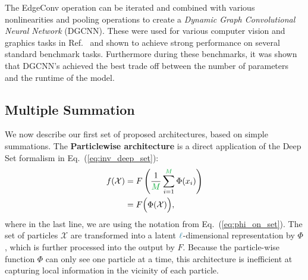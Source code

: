 \documentclass[aps,prd,twocolumn,superscriptaddress,floatfix,longbibliography,preprintnumbers,nofootinbib]{revtex4-1} %
\DeclareRobustCommand{\Eq}[1]{Eq.~(\ref{eq:#1})}
\newcounter{para}
\newcommand{\reft}[1]{Ref.~\cite{#1}}
\begin{document}
      The EdgeConv operation can be iterated and combined with various nonlinearities  and pooling operations to create a \textit{Dynamic Graph Convolutional Neural Network} (DGCNN). These were used for various computer vision and graphics tasks in \reft{Wang:2018nkf} and shown to achieve strong performance on several standard benchmark tasks.  Furthermore during these benchmarks, it was shown that DGCNN's achieved the best trade off between the number of parameters and the runtime of the model.

\subsection{Multiple Summation}
          \label{sec:local}
          
          
          We now describe our first set of proposed architectures, based on simple summations.
          The \textbf{Particlewise architecture} is a direct application of the Deep Set formalism in \Eq{inv_deep_set}:
          \begin{align}
	\nonumber f(\mathcal X) &= F\left(\frac{1}{\color{c2} M} \sum_{i=1}^{{\color{c2} M}} \Phi(x_i) \right) \\
            &= F\Big( \Phi(\mathcal X) \Big),
            \label{eq:particlewise_arch}
          \end{align}
          where in the last line, we are using the notation from \Eq{phi_on_set}.
          The set of particles $\mathcal X$ are transformed into a latent \({\color{c3}\ell}\)-dimensional representation by $\Phi$, which is further processed into the output by $F$.
          Because the particle-wise function $\Phi$ can only see one particle at a time, this architecture is inefficient at capturing local information in the vicinity of each particle.
          
\end{document}
